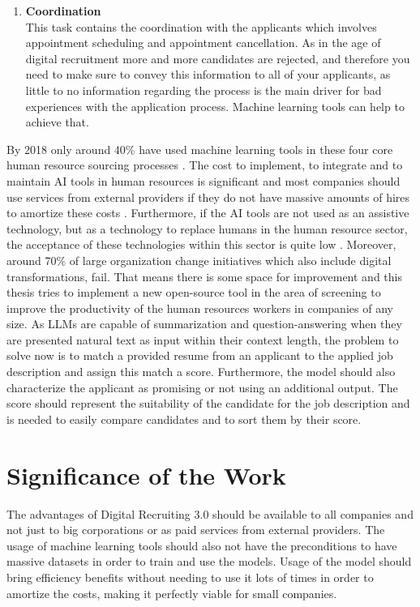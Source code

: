 \documentclass[draft,final]{thesisclass} %
\begin{document}
\begin{enumerate}
    \item \textbf{Coordination}\\
    This task contains the coordination with the applicants which involves appointment scheduling and appointment cancellation. As in the age of digital recruitment more and more candidates are rejected, and therefore you need to make sure to convey this information to all of your applicants, as little to no information regarding the process is the main driver for bad experiences with the application process. Machine learning tools can help to achieve that.
\end{enumerate}
By 2018 only around 40\% have used machine learning tools in these four core human resource sourcing processes \cite[4]{ai_recruiting}.
The cost to implement, to integrate and to maintain AI tools in human resources is significant and most companies should use services from external providers if they do not have massive amounts of hires to amortize these costs \cite[8]{ai_recruiting}.
Furthermore, if the AI tools are not used as an assistive technology, but as a technology to replace humans in the human resource sector, the acceptance of these technologies within this sector is quite low \cite[9]{ai_recruiting}.
Moreover, around 70\% of large organization change initiatives which also include digital transformations, fail.
That means there is some space for improvement and this thesis tries to implement a new open-source tool in the area of screening to improve the productivity of the human resources workers in companies of any size.
As \acs{LLM}s are capable of summarization and question-answering when they are presented natural text as input within their context length, the problem to solve now is to match a provided resume from an applicant to the applied job description and assign this match a score.
Furthermore, the model should also characterize the applicant as promising or not using an additional output.
The score should represent the suitability of the candidate for the job description and is needed to easily compare candidates and to sort them by their score.

\section{Significance of the Work} \label{significance_of_the_work}
The advantages of Digital Recruiting 3.0 should be available to all companies and not just to big corporations or as paid services from external providers.
The usage of machine learning tools should also not have the preconditions to have massive datasets in order to train and use the models.
Usage of the model should bring efficiency benefits without needing to use it lots of times in order to amortize the costs, making it perfectly viable for small companies.
\end{document}
